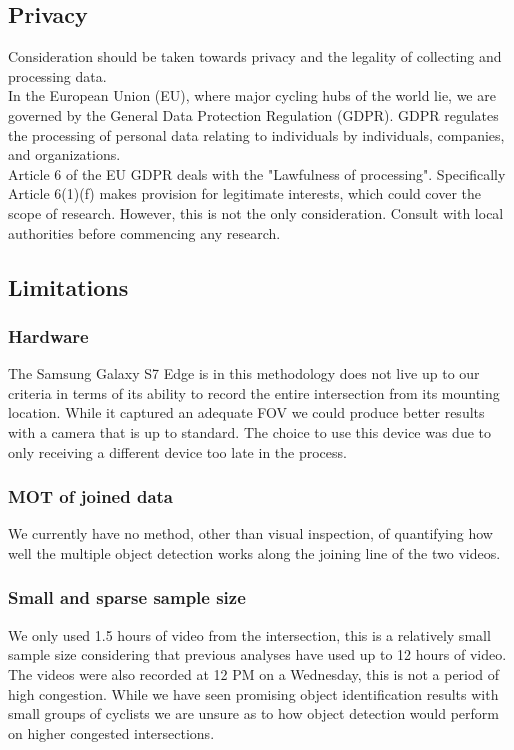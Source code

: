 \subsection{Privacy}

Consideration should be taken towards privacy and the legality of collecting and processing data.
\ \\

In the European Union (EU), where major cycling hubs of the world lie, we are governed by the General Data Protection Regulation (GDPR). GDPR regulates the processing of personal data 
relating to individuals by individuals, companies, and organizations.
\ \\

Article 6 of the EU GDPR deals with the "Lawfulness of processing". Specifically Article 6(1)(f)
makes provision for legitimate interests, which could cover the scope of research.
However, this is not the only consideration. Consult with local authorities before commencing any research.
\ \\

\subsection{Limitations}
\subsubsection{Hardware}
The Samsung Galaxy S7 Edge is in this methodology does not live up to our criteria in terms of its 
ability to record the entire intersection from its mounting location. While it captured an adequate 
FOV we could produce better results with a camera that is up to standard. The choice to use this device 
was due to only receiving a different device too late in the process.
\ \\

\subsubsection{MOT of joined data}
We currently have no method, other than visual inspection, of quantifying how well the multiple object 
detection works along the joining line of the two videos.
\ \\

\subsubsection{Small and sparse sample size}
We only used 1.5 hours of video from the intersection, this is a relatively small sample size considering
that previous analyses have used up to 12 hours of video. The videos were also recorded at 12 PM on a Wednesday,
this is not a period of high congestion. While we have seen promising object identification results with small groups
of cyclists we are unsure as to how object detection would perform on higher congested intersections. 
\ \\

